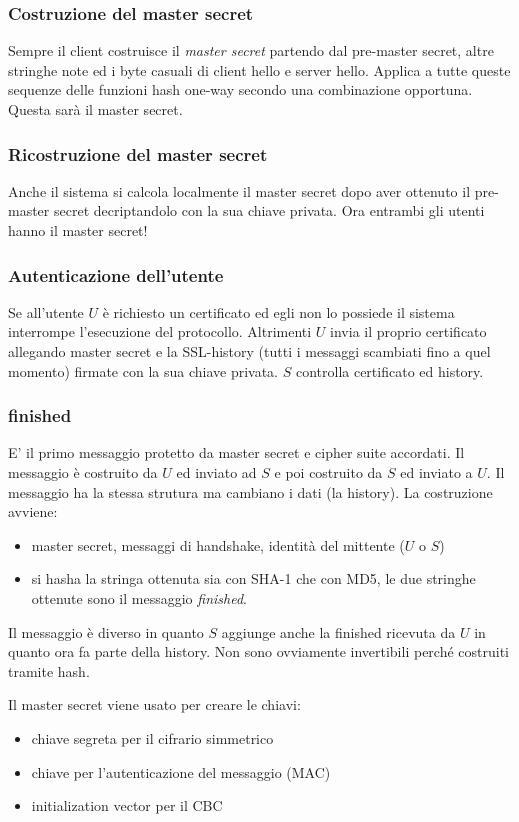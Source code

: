\subsubsection{Costruzione del master secret}
Sempre il client costruisce il \emph{master secret} partendo dal pre-master secret, altre stringhe note ed i byte casuali di client hello e server hello.
Applica a tutte queste sequenze delle funzioni hash one-way secondo una combinazione opportuna.
Questa sarà il master secret.

\subsubsection{Ricostruzione del master secret}
Anche il sistema si calcola localmente il master secret dopo aver ottenuto il pre-master secret decriptandolo con la sua chiave privata.
Ora entrambi gli utenti hanno il master secret!

\subsubsection{Autenticazione dell'utente}
Se all'utente $U$ è richiesto un certificato ed egli non lo possiede il sistema interrompe l'esecuzione del protocollo.
Altrimenti $U$ invia il proprio certificato allegando master secret e la SSL-history (tutti i messaggi scambiati fino a quel momento) firmate con la sua chiave privata.
$S$ controlla certificato ed history.

\subsubsection{finished}
E' il primo messaggio protetto da master secret e cipher suite accordati. Il messaggio è costruito da $U$ ed inviato ad $S$ e poi costruito da $S$ ed inviato a $U$. Il messaggio ha la stessa strutura ma cambiano i dati (la history).
La costruzione avviene:
\begin{itemize}
    \item master secret, messaggi di handshake, identità del mittente ($U$ o $S$)
    \item si hasha la stringa ottenuta sia con SHA-1 che con MD5, le due stringhe ottenute sono il messaggio \emph{finished}.
\end{itemize}
Il messaggio è diverso in quanto $S$ aggiunge anche la finished ricevuta da $U$ in quanto ora fa parte della history.
Non sono ovviamente invertibili perché costruiti tramite hash.

Il master secret viene usato per creare le chiavi:
\begin{itemize}
    \item chiave segreta per il cifrario simmetrico
    \item chiave per l'autenticazione del messaggio (MAC)
    \item initialization vector per il CBC
\end{itemize}

